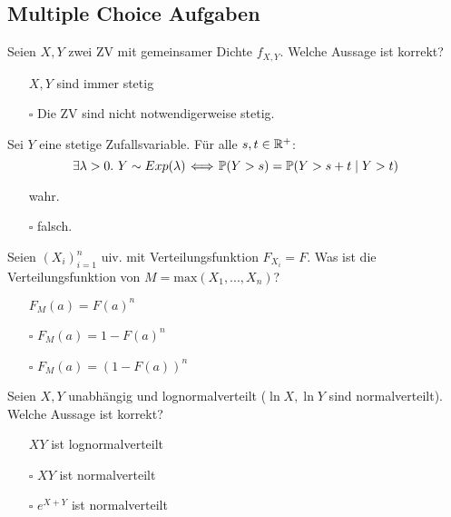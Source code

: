 \subsection{Multiple Choice Aufgaben}

Seien \(X,Y\) zwei ZV mit gemeinsamer Dichte \(f_{X,Y}\). Welche Aussage ist korrekt?
\begin{itemize}
	\item[\checkmark] \(X,Y\) sind immer stetig
	\item[\(\square\)] Die ZV sind nicht notwendigerweise stetig.
\end{itemize}

Sei $Y$ eine stetige Zufallsvariable. Für alle $s, t \in \mathbb{R}^+$:
$$\exists \lambda > 0. \ Y \sim Exp(\lambda)\!\iff\! \P(Y > s) = \P(Y > s + t \mid Y > t)$$
\begin{itemize}
	\item[\checkmark] wahr.
	\item[\(\square\)] falsch.
\end{itemize}


 \noindent
 Seien \((X_i)_{i = 1}^n\) uiv. mit Verteilungsfunktion \(F_{X_i} = F\). Was ist die Verteilungsfunktion von \(M = \text{max}(X_1,...,X_n)\)?
 \begin{itemize}
 	\item[\checkmark] \(F_M(a) = F(a)^n\)
 	\item[\(\square\)] \(F_M(a) = 1 - F(a)^n\)
 	\item[\(\square\)] \(F_M(a) = (1 - F(a))^n\)
 \end{itemize}

 \noindent
 Seien \(X, Y\) unabhängig und lognormalverteilt (\(\ln X, \ln Y\) sind normalverteilt). Welche Aussage ist korrekt?
 \begin{itemize}
 	\item[\checkmark] \(XY\) ist lognormalverteilt
 	\item[\(\square\)] \(XY\) ist normalverteilt
 	\item[\(\square\)] \(e^{X + Y}\) ist normalverteilt
 \end{itemize}

